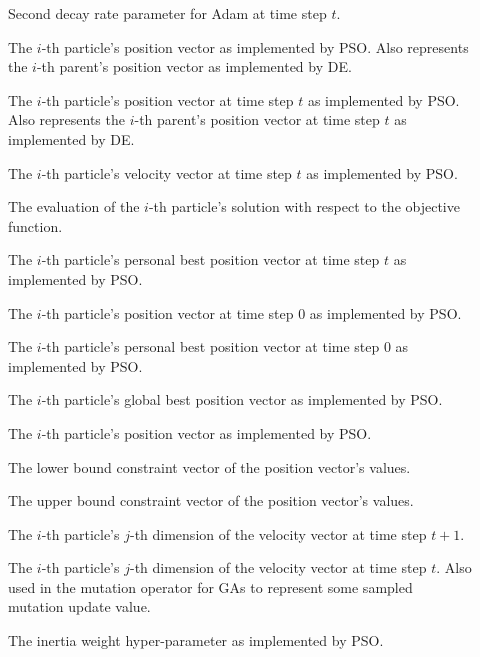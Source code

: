 \begin{description}
	\item [\parbox{2cm}{$\beta^{t}_{2}$}] Second decay rate parameter for \acs{Adam} at time step $t$.
	\item [\parbox{2cm}{$\boldsymbol{x}_{i}$}] The $i$-th particle's position vector as implemented by \acs{PSO}. Also represents the $i$-th parent's position vector as implemented by \acs{DE}.
	\item [\parbox{2cm}{$\boldsymbol{x}_{i}(t)$}] The $i$-th particle's position vector at time step $t$ as implemented by \acs{PSO}. Also represents the $i$-th parent's position vector at time step $t$ as implemented by \acs{DE}.
	\item [\parbox{2cm}{$\boldsymbol{v}_{i}(t)$}] The $i$-th particle's velocity vector at time step $t$ as implemented by \acs{PSO}.
	\item [\parbox{2cm}{$f(x_{i})$}] The evaluation of the $i$-th particle's solution with respect to the objective function.
	\item [\parbox{2cm}{$\boldsymbol{y}_{i}(t)$}] The $i$-th particle's personal best position vector at time step $t$ as implemented by \acs{PSO}.
	\item [\parbox{2cm}{$\boldsymbol{x}_{i}(0)$}] The $i$-th particle's position vector at time step $0$ as implemented by \acs{PSO}.
	\item [\parbox{2cm}{$\boldsymbol{y}_{i}(0)$}] The $i$-th particle's personal best position vector at time step $0$ as implemented by \acs{PSO}.
	\item [\parbox{2cm}{$\boldsymbol{\hat{y}}_{i}(t)$}] The $i$-th particle's global best position vector as implemented by \acs{PSO}.
	\item [\parbox{2cm}{$\boldsymbol{x}_{i}$}] The $i$-th particle's position vector as implemented by \acs{PSO}.
	\item [\parbox{2cm}{$\boldsymbol{x}_{min}$}] The lower bound constraint vector of the position vector's values.
	\item [\parbox{2cm}{$\boldsymbol{x}_{max}$}] The upper bound constraint vector of the position vector's values.
	\item [\parbox{2cm}{$v_{ij}(t+1)$}] The $i$-th particle's $j$-th dimension of the velocity vector at time step $t+1$.
	\item [\parbox{2cm}{$v_{ij}(t)$}] The $i$-th particle's $j$-th dimension of the velocity vector at time step $t$. Also used in the mutation operator for \acp{GA} to represent some sampled mutation update value.
	\item [\parbox{2cm}{$w$}] The inertia weight hyper-parameter as implemented by \acs{PSO}.

\end{description}

